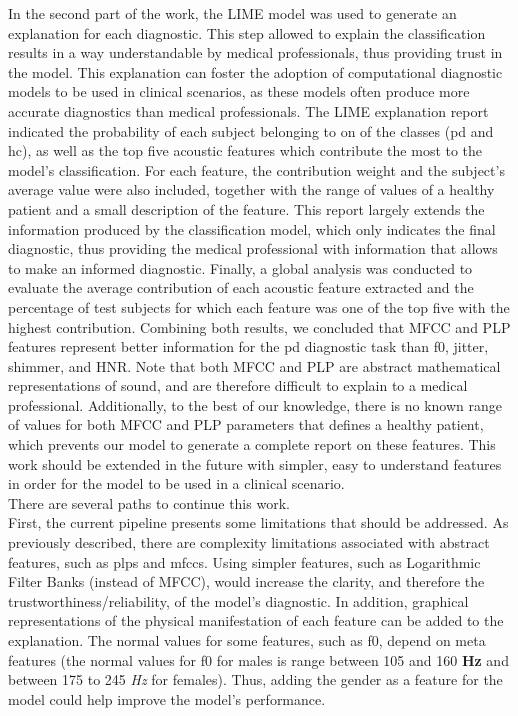 In the second part of the work, the LIME model was used to generate an explanation for each diagnostic. This step allowed to explain the classification results in a way understandable by medical professionals, thus providing trust in the model. This explanation can foster the adoption of computational diagnostic models to be used in clinical scenarios, as these models often produce more accurate diagnostics than medical professionals. The LIME explanation report indicated the probability of each subject belonging to on of the classes (\gls{pd} and \gls{hc}), as well as the top five acoustic features which contribute the most to the model's classification. For each feature, the contribution weight and the subject's average value were also included, together with the range of values of a healthy patient and a small description of the feature. This report largely extends the information produced by the classification model, which only indicates the final diagnostic, thus providing the medical professional with information that allows to make an informed diagnostic. Finally, a global analysis was conducted to evaluate the average contribution of each acoustic feature extracted and the percentage of test subjects for which each feature was one of the top five with the highest contribution. Combining both results, we concluded that MFCC and PLP features represent better information for the \gls{pd} diagnostic task than \gls{f0}, jitter, shimmer, and HNR. Note that both MFCC and PLP are abstract mathematical representations of sound, and are therefore difficult to explain to a medical professional. Additionally, to the best of our knowledge, there is no known range of values for both MFCC and PLP parameters that defines a healthy patient, which prevents our model to generate a complete report on these features. This work should be extended in the future with simpler, easy to understand features in order for the model to be used in a clinical scenario. \\
There are several paths to continue this work. \\
First, the current pipeline presents some limitations that should be addressed. As previously described, there are complexity limitations associated with abstract features, such as \gls{plp}s and \gls{mfcc}s. Using simpler features, such as Logarithmic Filter Banks (instead of MFCC), would increase the clarity, and therefore the trustworthiness/reliability, of the model's diagnostic. In addition, graphical representations of the physical manifestation of each feature can be added to the explanation. The normal values for some features, such as \gls{f0}, depend on meta features (the normal values for \gls{f0} for males is range between 105 and 160 \textbf{Hz} and between 175 to 245 \textit{Hz} for females). Thus, adding the gender as a feature for the model could help improve the model's performance. \\
